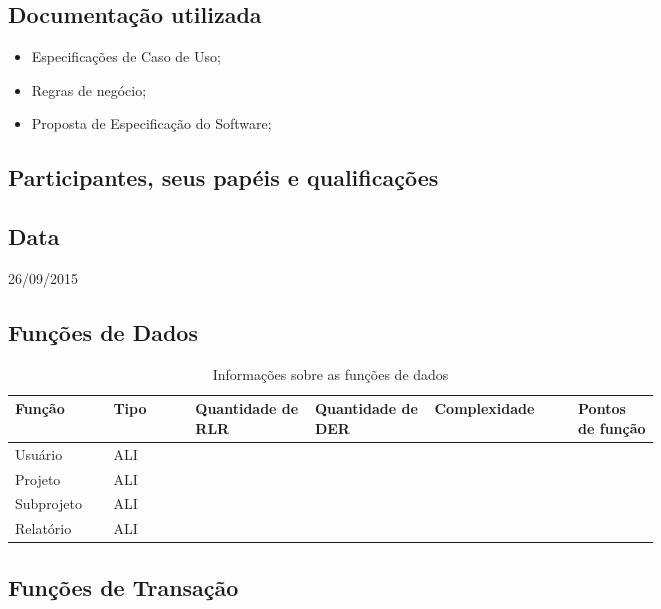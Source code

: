 \subsection{Documentação utilizada}

\begin{itemize}
 \item Especificações de Caso de Uso;
 \item Regras de negócio;
 \item Proposta de Especificação do Software;
\end{itemize}


\subsection{Participantes, seus papéis e qualificações}

\subsection{Data}
26/09/2015

\subsection{Funções de Dados}

\begin{table*}[!h]
\centering
\caption{Informações sobre as funções de dados}
\label{Rotulo}
  \begin{tabular}{|p{0.10\linewidth}|p{0.10\linewidth}|p{0.14\linewidth}|p{0.14\linewidth}|p{0.17\linewidth}|p{0.10\linewidth}|}
  \hline
  \textbf{Função} & \textbf{Tipo} & \textbf{Quantidade de RLR} & \textbf{Quantidade de DER} & \textbf{Complexidade} & \textbf{Pontos de função} \\
    \hline
  Usuário & ALI & & &  & \\
  \hline
  Projeto & ALI & & &  & \\
  \hline
  Subprojeto & ALI & &  & & \\
  \hline
  Relatório & ALI & &  & & \\
  \hline
  \end{tabular}
\end{table*}

\pagebreak
\subsection{Funções de Transação}

